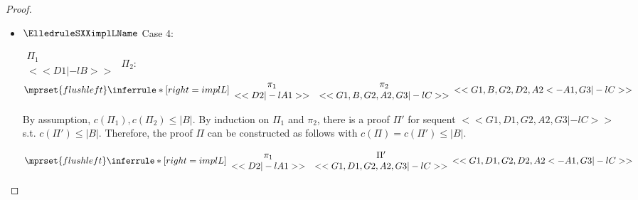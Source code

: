 \begin{proof}
\begin{enumerate}
\begin{itemize}
  \item $\ElledruleSXXimplLName$ Case 4:
      \begin{center}
        \scriptsize
        \begin{math}
          \begin{array}{c}
            \Pi_1 \\
            {<<D1 |-l B>>}
          \end{array}
        \end{math}
        \qquad\qquad
        $\Pi_2$:
        \begin{math}
          $$\mprset{flushleft}
          \inferrule* [right={\tiny implL}] {
            {
              \begin{array}{cc}
                \pi_1 & \pi_2 \\
                {<<D2 |-l A1>>} & {<<G1, B, G2, A2, G3 |-l C>>}
              \end{array}
            }
          }{<<G1, B, G2, D2, A2 <- A1, G3 |-l C>>}
        \end{math}
      \end{center}
      By assumption, $c(\Pi_1),c(\Pi_2)\leq |B|$. By induction on $\Pi_1$ and $\pi_2$, there is
      a proof $\Pi'$ for sequent $<<G1, D1, G2, A2, G3 |-l C>>$ s.t. $c(\Pi') \leq |B|$.
      Therefore, the proof $\Pi$ can be constructed as follows with
      $c(\Pi) = c(\Pi') \leq |B|$.
      \begin{center}
        \scriptsize
        \begin{math}
          $$\mprset{flushleft}
          \inferrule* [right={\tiny implL}] {
            {
              \begin{array}{cc}
                \pi_1 & \Pi' \\
                {<<D2 |-l A1>>} & {<<G1, D1, G2, A2, G3 |-l C>>}
              \end{array}
            }
          }{<<G1, D1, G2, D2, A2 <- A1, G3 |-l C>>}
        \end{math}
      \end{center}


\end{itemize}
\end{enumerate}
\end{proof}
